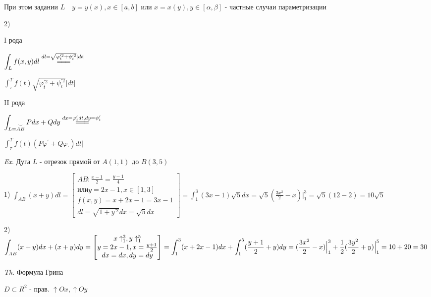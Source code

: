 \documentclass[12pt]{article}
\begin{document}
    При этом задании $L \quad y = y(x), x \in [a, b]$ или $x = x(y), y \in [\alpha, \beta]$ - частные случаи параметризации

    2) \begin{multicols}{2}
        I рода

        $\displaystyle \int_{L} f(x, y) dl \stackrel{dl = \sqrt{\varphi_t^{\prime 2} + \psi_t^{\prime 2}}|dt|}{=\joinrel=\joinrel=\joinrel}$

        $\displaystyle \int_\tau^T f(t) \sqrt{\varphi_t^{\prime 2} + \psi_t^{\prime 2}}|dt|$

        II рода

        $\displaystyle \int_{L = \overset{\smile}{AB}}Pdx + Qdy \stackrel{dx = \varphi_t^\prime dt, dy = \psi_t^\prime}{=\joinrel=\joinrel=\joinrel}
        $

        $\displaystyle \int_\tau^T f(t) (P\varphi^\prime + Q\varphi_\prime)dt|$

    \end{multicols}

    \vspace{3mm}
\textit{Ex}. Дуга $L$ - отрезок прямой от $A(1, 1)$ до $B(3, 5)$

    1) $\displaystyle \int_{AB} (x + y) dl = \begin{bmatrix}AB: \frac{x - 1}{2} = \frac{y - 1}{4} \\
    \text{или} y = 2x - 1, x \in [1, 3] \\
    f(x, y) = x + 2x - 1 = 3x - 1 \\
    dl = \sqrt{1 + y^{\prime 2}}dx = \sqrt{5}dx\end{bmatrix} =
    \int_1^3 (3x - 1) \sqrt{5}dx = \sqrt{5} (\frac{3x^2}{2} - x) \Big|_1^3 = \sqrt{5}(12 - 2) = 10\sqrt{5}$

    2) $\displaystyle \int_{AB} (x + y) dx + (x + y) dy = \begin{bmatrix}x \uparrow^3_1, y \uparrow^5_1 \\
    y = 2x - 1, x = \frac{y + 1}{2} \\
    dx = dx, dy = dy\end{bmatrix} = \int_1^3 (x + 2x - 1) dx + \int^5_1 (\frac{y + 1}{2} + y) dy = \\
    (\frac{3x^2}{2} - x) \Big|_1^3 + \frac{1}{2} (\frac{3y^2}{2} + y) \Big|_1^5 = 10 + 20 = 30$

    \vspace{3mm}
\textit{Th}. Формула Грина

    $D \subset R^2$ - прав. $\uparrow Ox, \uparrow Oy$
\end{document}
